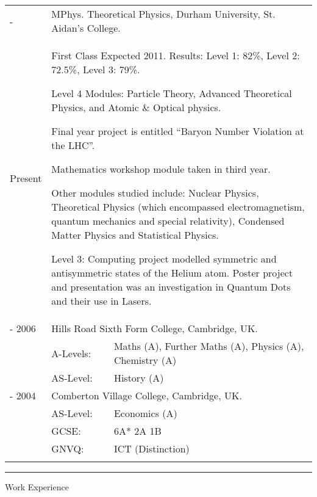 \begin{tablehere}
  \begin{tabular}{p{\wa\textwidth} p{2cm} l}
    \sc2007 -		&	\multicolumn{2}{p{\wb\textwidth}}{ \sc MPhys$.$ Theoretical Physics, Durham University, St$.$ Aidan's College.}\\
    \sc Present	&	\multicolumn{2}{p{\wb\textwidth}}{{\sc First Class Expected 2011.}  Results: Level 1: 82\%, Level 2: 72.5\%, Level 3: 79\%.
    \begin{list}{}{\leftmargin=1em}
    \item Level 4 Modules: Particle Theory, Advanced Theoretical Physics, and Atomic \& Optical physics.
    \item Final year project is entitled ``Baryon Number Violation at the LHC''.
    \item Mathematics workshop module taken in third year.
    \item Other modules studied include: Nuclear Physics, Theoretical Physics (which encompassed electromagnetism, quantum mechanics  and special relativity), Condensed Matter Physics and Statistical Physics.
    \item Level 3: Computing project modelled symmetric and antisymmetric states of the Helium atom.  Poster project and presentation was an investigation in Quantum Dots and their use in Lasers.
    \end{list} }\\
    \sc2004 - 2006	&	\multicolumn{2}{p{\wb\textwidth}}{\sc Hills Road Sixth Form College, Cambridge, UK.}	\\
    &	\sc A-Levels: 	&\rm Maths (A), Further Maths (A), Physics (A), Chemistry (A)			\\
    &	\sc AS-Level:	&\rm History (A)											\\
    \sc1999 - 2004	&	\multicolumn{2}{p{\wb\textwidth}}{\sc Comberton Village College, Cambridge, UK.}		\\
    &	\sc AS-Level:	& \rm Economics (A)											\\
    &	\sc GCSE:		& 6A* 2A 1B												\\
    &	\sc GNVQ:	& ICT (Distinction)											\\\\
  \end{tabular}
\end{tablehere}

\hrule\vspace{0.2cm}
\sc Work Experience \rm

